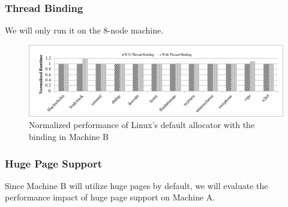 \subsubsection{Thread Binding}
\label{sec: threadbinding}

We will only run it on the 8-node machine.  

\begin{figure}[!h]
    \centering
    \includegraphics[width=\textwidth]{figure/WO-pthread-binding.pdf}
    \caption{Normalized performance of Linux's default allocator with the binding in Machine B}
    \label{binding-pthread-scalibity}
\end{figure}

\subsubsection{Huge Page Support} 
Since Machine B will utilize huge pages by default, we will evaluate the performance impact of huge page support on Machine A. 


